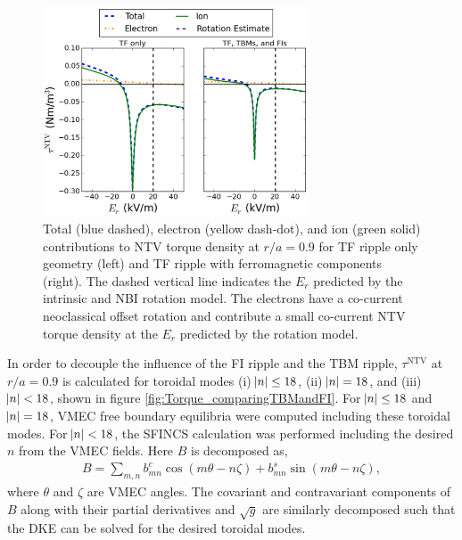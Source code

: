 \documentclass[aip, pop, preprint]{revtex4-1}
\begin{document}
\begin{figure}[h!]
\centering
\includegraphics[width=0.7\textwidth]{figure7.eps}
\caption{\label{fig:Torque_eandi} Total (blue dashed), electron (yellow dash-dot), and ion (green solid) contributions to NTV torque density at $r/a = 0.9$ for TF ripple only geometry (left) and TF ripple with ferromagnetic components (right). The dashed vertical line indicates the $E_r$ predicted by the intrinsic and NBI rotation model. The electrons have a co-current neoclassical offset rotation and contribute a small co-current NTV torque density at the $E_r$ predicted by the rotation model.}
\end{figure}

In order to decouple the influence of the FI ripple and the TBM ripple, $\tau^{\mathrm{NTV}}$ at $r/a = 0.9$ is calculated for toroidal modes (i) $\abs{n} \leq 18$, (ii) $\abs{n} = 18$, and (iii) $\abs{n} < 18$, shown in figure \ref{fig:Torque_comparingTBMandFI}. For $\abs{n} \leq 18$ and $\abs{n} = 18$, VMEC free boundary equilibria were computed including these toroidal modes. For $\abs{n} < 18$, the SFINCS calculation was performed including the desired $n$ from the VMEC fields. Here $B$ is decomposed as,
\begin{gather}
B = \sum_{m,n} b_{mn}^c \cos(m\theta-n\zeta) + b_{mn}^s \sin(m\theta-n\zeta),
\end{gather}
where $\theta$ and $\zeta$ are VMEC angles. The covariant and contravariant components of $B$ along with their partial derivatives and $\sqrt{g}$ are similarly decomposed such that the DKE can be solved for the desired toroidal modes.
\end{document}
